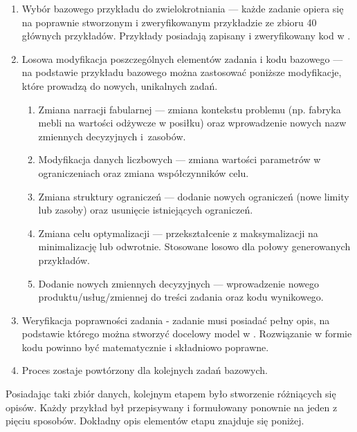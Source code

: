 \begin{enumerate}
\item Wybór bazowego przykładu do zwielokrotniania --- każde zadanie opiera się na poprawnie stworzonym i zweryfikowanym przykładzie ze zbioru 40 głównych przykładów. Przykłady posiadają zapisany i zweryfikowany kod w .
\item Losowa modyfikacja poszczególnych elementów zadania i kodu bazowego --- na podstawie przykładu bazowego można zastosować poniższe modyfikacje, które prowadzą do nowych, unikalnych zadań.
\begin{enumerate}
\item Zmiana narracji fabularnej --- zmiana kontekstu problemu (np. fabryka mebli na wartości odżywcze w posiłku) oraz wprowadzenie nowych nazw zmiennych decyzyjnych i~zasobów.
\item Modyfikacja danych liczbowych --- zmiana wartości parametrów w ograniczeniach oraz zmiana współczynników celu.
\item Zmiana struktury ograniczeń --- dodanie nowych ograniczeń (nowe limity lub zasoby) oraz usunięcie istniejących ograniczeń.
\item Zmiana celu optymalizacji --- przekształcenie z maksymalizacji na minimalizację lub odwrotnie. Stosowane losowo dla połowy generowanych przykładów.
\item Dodanie nowych zmiennych decyzyjnych --- wprowadzenie nowego produktu/usług/zmiennej do treści zadania oraz kodu wynikowego.
\end{enumerate}
\item Weryfikacja poprawności zadania - zadanie musi posiadać pełny opis, na podstawie którego można stworzyć docelowy model w . Rozwiązanie w formie kodu powinno być matematycznie i składniowo poprawne.
\item Proces zostaje powtórzony dla kolejnych zadań bazowych.
\end{enumerate}

Posiadając taki zbiór danych, kolejnym etapem było stworzenie różniących się opisów. Każdy przykład był przepisywany i formułowany ponownie na jeden z pięciu sposobów. Dokładny opis elementów etapu znajduje się poniżej.


